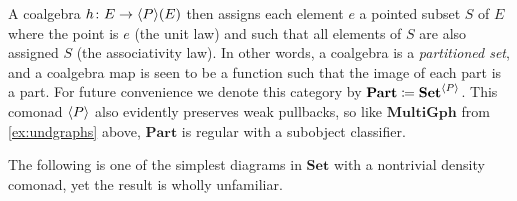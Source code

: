 \documentclass[11pt, oneside, article]{memoir}
\theoremstyle{plain}
\theoremstyle{definition}
\theoremstyle{remark}
\newenvironment{example}
{\renewcommand\qedsymbol{$\lrcorner$}%
  \pushQED{\qed}\myexample}
{\popQED\endmyexample}
\DeclarePairedDelimiter{\gen}{\langle}{\rangle}
\newcommand{\namedcat}[1]{\mathbf{#1}}
\newcommand{\Set}{\namedcat{Set}}
\newcommand{\MultiGph}{\namedcat{MultiGph}}
\newcommand{\Part}{\namedcat{Part}}
\newcommand{\CoalgOn}[2]{{#2}^{#1}}
\newcommand{\CoalgSet}[1]{\CoalgOn{#1}{\Set}}
\newcommand{\ph}[1]{#1}
\newcommand{\eE}{E}
\newcommand{\xS}{S}
\newcommand{\hK}{k}
\newcommand{\hH}{h}
\newcommand{\pP}{\ph{P}}
\newcommand{\cP}{\gen{\pP}}
\newcommand{\PSet}{\CoalgSet{\cP}}
\begin{document}
\begin{example}[Partitions]
  A coalgebra $\hH \colon \eE \to \cP(\eE)$ then assigns each element
  $e$ a pointed subset $\xS$ of $\eE$ where the point is $e$ (the unit
  law) and such that all elements of $\xS$ are also assigned $\xS$ (the
  associativity law).
  In other words, a coalgebra is a \emph{partitioned set}, and a
  coalgebra map is seen to be a function such that the image of each
  part is a part. For future convenience we denote this category by
  $\Part \coloneqq \PSet$.  This comonad $\cP$ also evidently
  preserves weak pullbacks, so like $\MultiGph$ from
  \cref{ex:undgraphs} above, $\Part$ is regular with a subobject
  classifier.
\end{example}

The following is one of the simplest diagrams in $\Set$ with a
nontrivial density comonad, yet the result is wholly unfamiliar.
\end{document}
